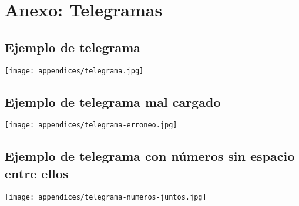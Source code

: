 \chapter{Anexo: Telegramas}

\section{Ejemplo de telegrama}
\label{anexo:telegrama}

\texttt{[image: appendices/telegrama.jpg]}

\section{Ejemplo de telegrama mal cargado}
\label{anexo:telegrama-erroneo}

\texttt{[image: appendices/telegrama-erroneo.jpg]}

\section{Ejemplo de telegrama con n\'umeros sin espacio entre ellos}
\label{anexo:telegrama-numeros-juntos}

\texttt{[image: appendices/telegrama-numeros-juntos.jpg]}
